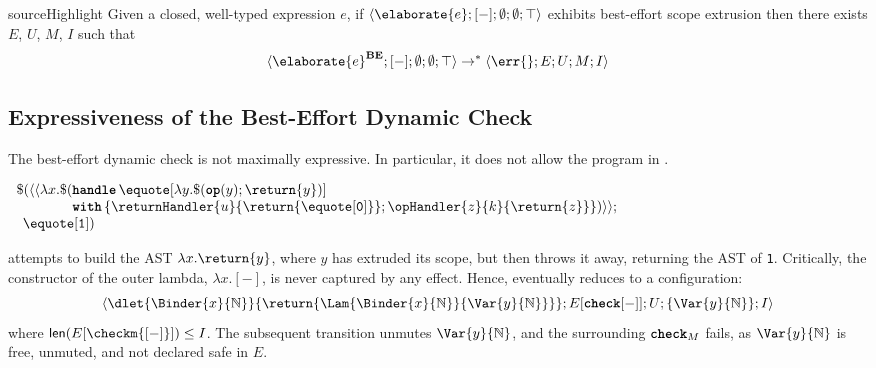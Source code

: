 \begin{theorem}{sourceHighlight} Given a closed, well-typed \sourceLang{} expression $e$, if  $\langle \elaborate{e}; [-]; \emptyset; \emptyset; \top \rangle$ exhibits best-effort scope extrusion 
then there exists $E$, $U$, $M$, $I$ such that \[\langle \elaborate{e}^{\textbf{BE}}; [-]; \emptyset; \emptyset; \top \rangle \to^{*}\langle \err{}; E; U; M; I \rangle\]
\end{theorem}

\subsection{Expressiveness of the Best-Effort Dynamic Check}\label{subsection:best-effort-expressive}
The best-effort dynamic check is not maximally expressive. In particular, it does not allow the program in . 

\begin{code}
  \begin{source}
    $
    \begin{array}{l}
      \$(\langle \langle \lambda x. \$ (\textbf{\texttt{handle}} \, \equote[{\lambda y. \$(\textbf{\texttt{op}}(y); \return{y})}]\\
      \quad\quad\quad\quad\textbf{\texttt{with}} \, \{ \returnHandler{u}{\return{\equote[\texttt{0}]}}; \opHandler{z}{k}{\return{z}}\})\rangle\rangle;\\
      \;\, \equote[{\texttt{1}}])
    \end{array}
    $
  \end{source}
  \label{listing:best-effort-imperfect}
\end{code}

 attempts to build the AST $\lambda x.\return{y}$, where $y$ has extruded its scope, but then throws it away, returning the AST of \texttt{1}. Critically, the constructor of the outer lambda, $\lambda x. [-]$, is never captured by any effect. Hence,  eventually reduces to a configuration: 
\[\langle \dlet{\Binder{x}{\mathbb{N}}}{\return{\Lam{\Binder{x}{\mathbb{N}}}{\Var{y}{\mathbb{N}}}}}; E[\textbf{\texttt{check}}[-]]; U; \{\Var{y}{\mathbb{N}}\} ; I \rangle\]
where $\textsf{len}(E[\checkm{[-]}]) \leq I$. The subsequent transition unmutes $\Var{y}{\mathbb{N}}$, and the surrounding $\textbf{\texttt{check}}_M$ fails, as $\Var{y}{\mathbb{N}}$ is free, unmuted, and not declared safe in $E$.

